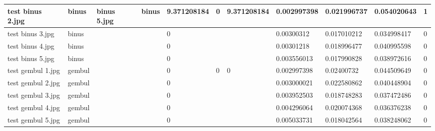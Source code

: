 \begin{landscape}
\begin{longtable}{|p{2cm}|p{1.5cm}|p{2cm}|p{1.5cm}|p{2cm}|p{1cm}|p{2cm}|p{2cm}|p{2cm}|p{2cm}|p{1cm}|}
		test binus 2.jpg     & binus            & binus 5.jpg           & binus                       & 9.371208184           & 0                       & 9.371208184                & 0.002997398           & 0.021996737           & 0.054020643              & 1                \\ \hline
		test binus 3.jpg     & binus            &                       &                             & 0                     &                         &                            & 0.00300312            & 0.017010212           & 0.034998417              & 0                \\ \hline
		test binus 4.jpg     & binus            &                       &                             & 0                     &                         &                            & 0.00301218            & 0.018996477           & 0.040995598              & 0                \\ \hline
		test binus 5.jpg     & binus            &                       &                             & 0                     &                         &                            & 0.003556013           & 0.017990828           & 0.038972616              & 0                \\ \hline
		test gembul 1.jpg    & gembul           &                       &                             & 0                     & 0                       & 0                          & 0.002997398           & 0.02400732            & 0.044509649              & 0                \\ \hline
		test gembul 2.jpg    & gembul           &                       &                             & 0                     &                         &                            & 0.003000021           & 0.022580862           & 0.040448904              & 0                \\ \hline
		test gembul 3.jpg    & gembul           &                       &                             & 0                     &                         &                            & 0.003952503           & 0.018748283           & 0.037472486              & 0                \\ \hline
		test gembul 4.jpg    & gembul           &                       &                             & 0                     &                         &                            & 0.004296064           & 0.020074368           & 0.036376238              & 0                \\ \hline
		test gembul 5.jpg    & gembul           &                       &                             & 0                     &                         &                            & 0.005033731           & 0.018042564           & 0.038248062              & 0                \\ \hline

\end{longtable}
\end{landscape}
